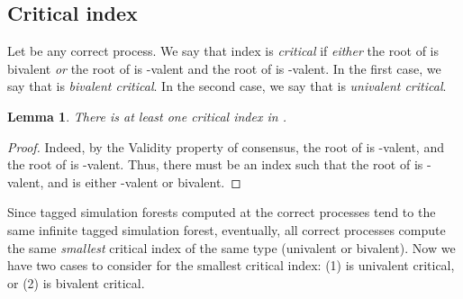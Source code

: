 \documentclass[11pt]{article}
\newtheorem{lemma}{Lemma}
\newcommand{\ignore}[1]{}
\begin{document}
	
\subsection{Critical index}
\label{subsec:cht:critical}


Let  be any correct process.
We say that index  is \emph{critical}
	if \emph{either} the root of  is bivalent \emph{or}
	the root of  is -valent and the root of  is -valent.
In the first case, we say that  is \emph{bivalent critical}.
In the second case, we say that
	 is \emph{univalent critical}.

\begin{lemma}
\label{lemma:cht-critical}
There is at least one critical index in .
\end{lemma}
\begin{proof}
Indeed, by the Validity property of consensus, the root of  is -valent,
	and the root of  is -valent.
Thus, there must be an index  such that
	the root of  is -valent,
	and  is either
	-valent or bivalent.
\end{proof}

\noindent
Since tagged simulation forests computed at the correct processes tend
	to the same infinite tagged simulation forest,
	eventually, all correct processes compute the same \emph{smallest} critical
	index  of the same type (univalent or bivalent).
Now we have two cases to consider for the smallest critical index: (1)  is univalent critical, or
	(2)  is bivalent critical.

\ignore{
Before extracting a correct process from the simulated forest,
	we observe the following:
\begin{lemma}
\label{lemma:cht-similar}
Let  and  be two vertices of  and  be a process
	 such that for all ,
	the states of  in  and  are identical.
If  is -valent and  is -valent, then  is correct.
\end{lemma}
\begin{proof}
By contradiction, assume that  is faulty.
Let  be induced by a path  in , and let  be
	induced by a path  in .
Then  contains infinite paths  and  such that in ,
	 does not participate and every correct process participates infinitely often.
Then  contains a schedule 
	that is applicable to  (induced by a prefix of  and ) in which
	 does not take steps and every correct process  decides.
Since  is -valent,  decides  in .
But  is the only process that has different states in
	, and  and  does not take part in .
Thus,  (induced by a prefix of  and ) is also a vertex of ,
	and  decides  in .
But the root of  is -valent
	--- a contradiction.
\end{proof}
}
\end{document}
